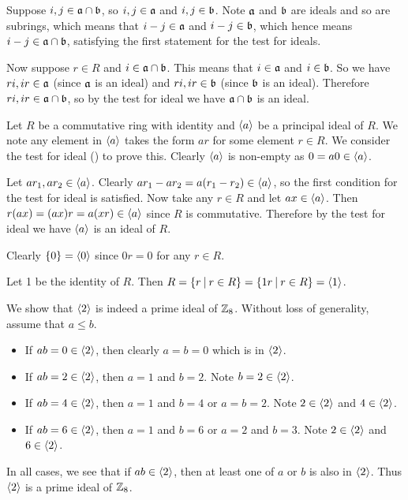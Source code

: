\begin{questions}
    Suppose $i,j\in\mathfrak{a}\cap\mathfrak{b}$, so $i,j \in \mathfrak{a}$ and $i,j \in \mathfrak{b}$. Note $\mathfrak{a}$ and $\mathfrak{b}$ are ideals and so are subrings, which means that $i-j \in \mathfrak{a}$ and $i-j \in \mathfrak{b}$, which hence means $i-j \in \mathfrak{a}\cap\mathfrak{b}$, satisfying the first statement for the test for ideals.

    Now suppose $r \in R$ and $i \in \mathfrak{a}\cap\mathfrak{b}$. This means that $i \in \mathfrak{a}$ and $i \in \mathfrak{b}$. So we have $ri, ir \in \mathfrak{a}$ (since $\mathfrak{a}$ is an ideal) and $ri, ir \in \mathfrak{b}$ (since $\mathfrak{b}$ is an ideal). Therefore $ri,ir \in \mathfrak{a}\cap\mathfrak{b}$, so by the test for ideal we have $\mathfrak{a}\cap\mathfrak{b}$ is an ideal.

    \item Let $R$ be a commutative ring with identity and $\left\langle a\right\rangle$ be a principal ideal of $R$. We note any element in $\left\langle a\right\rangle$ takes the form $ar$ for some element $r \in R$. We consider the test for ideal () to prove this. Clearly $\left\langle a\right\rangle$ is non-empty as $0 = a0 \in \left\langle a\right\rangle$.
    
    Let $ar_1, ar_2 \in \left\langle a\right\rangle$. Clearly $ar_1 - ar_2 = a(r_1-r_2) \in \left\langle a\right\rangle$, so the first condition for the test for ideal is satisfied. Now take any $r \in R$ and let $ax \in \left\langle a\right\rangle$. Then $r(ax) = (ax)r = a(xr) \in \left\langle a\right\rangle$ since $R$ is commutative. Therefore by the test for ideal we have $\left\langle a\right\rangle$ is an ideal of $R$.

    \item \begin{partquestions}{\alph*}
        \item Clearly $\{0\} = \left\langle0\right\rangle$ since $0r = 0$ for any $r \in R$.
        \item Let 1 be the identity of $R$. Then $R = \{r \vert r \in R\} = \{1r \vert r \in R\} = \princ{1}$.
    \end{partquestions}

    \item We show that $\left\langle2\right\rangle$ is indeed a prime ideal of $\mathbb{Z}_8$. Without loss of generality, assume that $a \leq b$.
    \begin{itemize}
        \item If $ab = 0 \in \left\langle2\right\rangle$, then clearly $a = b = 0$ which is in $\left\langle2\right\rangle$.
        \item If $ab = 2 \in \left\langle2\right\rangle$, then $a = 1$ and $b = 2$. Note $b = 2 \in \left\langle2\right\rangle$.
        \item If $ab = 4 \in \left\langle2\right\rangle$, then $a = 1$ and $b = 4$ or $a = b = 2$. Note $2 \in \left\langle2\right\rangle$ and $4 \in \left\langle2\right\rangle$.
        \item If $ab = 6 \in \left\langle2\right\rangle$, then $a = 1$ and $b = 6$ or $a = 2$ and $b = 3$. Note $2 \in \left\langle2\right\rangle$ and $6 \in \left\langle2\right\rangle$.
    \end{itemize}
    In all cases, we see that if $ab \in \left\langle2\right\rangle$, then at least one of $a$ or $b$ is also in $\left\langle2\right\rangle$. Thus $\left\langle2\right\rangle$ is a prime ideal of $\mathbb{Z}_8$.


\end{questions}
